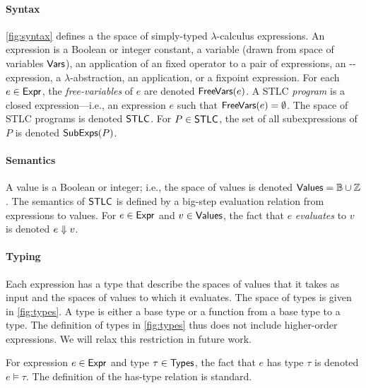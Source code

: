 \paragraph{Syntax} \autoref{fig:syntax} defines a the space of
simply-typed $\lambda$-calculus expressions.
%
An expression is a Boolean or integer constant, %
a variable (drawn from space of variables $\mathsf{Vars}$), %
an application of an fixed operator to a pair of expressions, %
an -- expression, %
a $\lambda$-abstraction, %
an application, or %
a fixpoint expression.
%
For each $e \in \mathsf{Expr}$, the \emph{free-variables} of $e$ are denoted
$\mathsf{FreeVars}(e)$.
%
A STLC \emph{program} is a closed expression---i.e., an expression $e$
such that $\mathsf{FreeVars}(e) = \emptyset$.
%
The space of STLC programs is denoted $\mathsf{STLC}$.
%
For $P \in \mathsf{STLC}$, the set of all subexpressions of $P$ is denoted
$\mathsf{SubExps}(P)$.

\paragraph{Semantics}
%
A value is a Boolean or integer;
%
i.e., the space of values is denoted $\mathsf{Values} = \mathbb{B} \cup \mathbb{Z}$.
%
%
The semantics of $\mathsf{STLC}$ is defined by a big-step evaluation relation
from expressions to values.
%
For $e \in \mathsf{Expr}$ and $v \in \mathsf{Values}$, the fact that $e$
\emph{evaluates} to $v$ is denoted $e \Downarrow v$.


\paragraph{Typing}
%
Each expression has a type that describe the spaces of values that it
takes as input and the spaces of values to which it evaluates.
%
The space of types is given in \autoref{fig:types}.
%
A type is either a base type or a function from a base type to a type.
%
The definition of types in \autoref{fig:types} thus does not include
higher-order expressions.
%
We will relax this restriction in future work.
%

For expression $e \in \mathsf{Expr}$ and type $\tau \in \mathsf{Types}$, the fact that
$e$ has type $\tau$ is denoted $e \models \tau$.
%
The definition of the has-type relation is standard.


